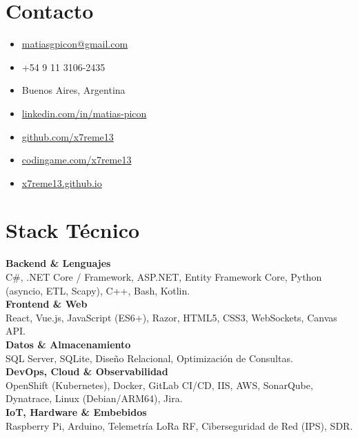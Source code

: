 \documentclass[10pt,a4paper]{article}
\begin{document}
\hspace*{1.2cm}%
\begin{minipage}[t]{6.3cm}
\raggedright

\section{Contacto}
{\footnotesize\color{darktext}
\begin{itemize}[leftmargin=1.5em, itemsep=3.5pt, topsep=2pt]
  \item[\faEnvelope] \href{mailto:matiasgpicon@gmail.com}{matiasgpicon@gmail.com}
  \item[\faPhone] +54 9 11 3106-2435
  \item[\faMapMarker*] Buenos Aires, Argentina
  \item[\faLinkedin] \href{https://www.linkedin.com/in/matias-picon}{linkedin.com/in/matias-picon}
  \item[\faGithub] \href{https://github.com/x7reme13}{github.com/x7reme13}
  \item[\faCode] \href{https://www.codingame.com/profile/x7reme13}{codingame.com/x7reme13}
  \item[\faGlobe] \href{https://x7reme13.github.io}{x7reme13.github.io}
\end{itemize}
}

\section{Stack Técnico}
{\footnotesize\color{darktext}
\textbf{\color{primary}Backend \& Lenguajes}\\
C\#, .NET Core / Framework, ASP.NET, Entity Framework Core, Python (asyncio, ETL, Scapy), C++, Bash, Kotlin.\\[4pt]
\textbf{\color{primary}Frontend \& Web}\\
React, Vue.js, JavaScript (ES6+), Razor, HTML5, CSS3, WebSockets, Canvas API.\\[4pt]
\textbf{\color{primary}Datos \& Almacenamiento}\\
SQL Server, SQLite, Diseño Relacional, Optimización de Consultas.\\[4pt]
\textbf{\color{primary}DevOps, Cloud \& Observabilidad}\\
OpenShift (Kubernetes), Docker, GitLab CI/CD, IIS, AWS, SonarQube, Dynatrace, Linux (Debian/ARM64), Jira.\\[4pt]
\textbf{\color{primary}IoT, Hardware \& Embebidos}\\
Raspberry Pi, Arduino, Telemetría LoRa RF, Ciberseguridad de Red (IPS), SDR.
}


\end{minipage}
\end{document}

